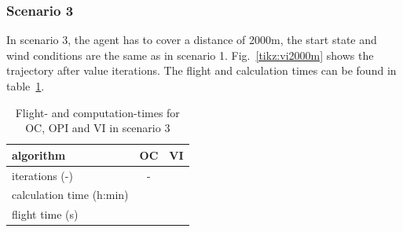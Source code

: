 \subsubsection{Scenario 3}

In scenario 3, the agent has to cover a distance of 2000m, the start state and wind conditions are the same as in scenario 1. Fig.~\ref{tikz:vi2000m} shows the trajectory after  value iterations. The flight and calculation times can be found in table~\ref{tab:2d_flight_data_2000m}.

\begin{table}[htb]
	\begin{center}
		\begin{tabular}{l|c c}
			algorithm & OC & VI \\ \hline 
			iterations (-) & - &  \\
			calculation time (h:min) &&  \\
			flight time (s) &  & 
		\end{tabular}
		\caption{Flight- and computation-times for OC, OPI and VI in scenario 3}
		\label{tab:2d_flight_data_2000m}
	\end{center}
\end{table}

